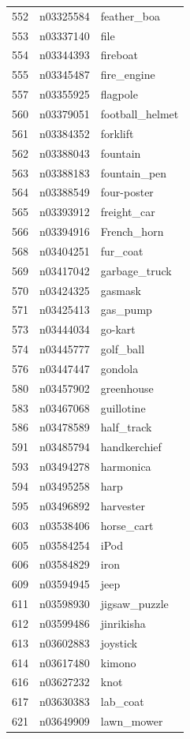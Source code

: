 \begin{table}
\begin{tabular}{cll}
552 & n03325584 & feather_boa \\
553 & n03337140 & file \\
554 & n03344393 & fireboat \\
555 & n03345487 & fire_engine \\
557 & n03355925 & flagpole \\
560 & n03379051 & football_helmet \\
561 & n03384352 & forklift \\
562 & n03388043 & fountain \\
563 & n03388183 & fountain_pen \\
564 & n03388549 & four-poster \\
565 & n03393912 & freight_car \\
566 & n03394916 & French_horn \\
568 & n03404251 & fur_coat \\
569 & n03417042 & garbage_truck \\
570 & n03424325 & gasmask \\
571 & n03425413 & gas_pump \\
573 & n03444034 & go-kart \\
574 & n03445777 & golf_ball \\
576 & n03447447 & gondola \\
580 & n03457902 & greenhouse \\
583 & n03467068 & guillotine \\
586 & n03478589 & half_track \\
591 & n03485794 & handkerchief \\
593 & n03494278 & harmonica \\
594 & n03495258 & harp \\
595 & n03496892 & harvester \\
603 & n03538406 & horse_cart \\
605 & n03584254 & iPod \\
606 & n03584829 & iron \\
609 & n03594945 & jeep \\
611 & n03598930 & jigsaw_puzzle \\
612 & n03599486 & jinrikisha \\
613 & n03602883 & joystick \\
614 & n03617480 & kimono \\
616 & n03627232 & knot \\
617 & n03630383 & lab_coat \\
621 & n03649909 & lawn_mower \\

\end{tabular}
\end{table}
